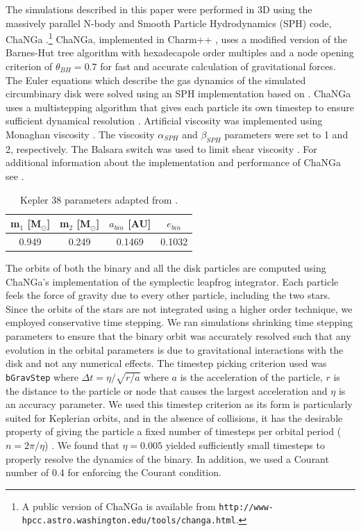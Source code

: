 The simulations described in this paper were performed in 3D using the massively parallel N-body 
and Smooth Particle Hydrodynamics (SPH) code, ChaNGa
\citep{Menon2015}.\footnote{A public version of ChaNGa is available
  from {\tt http://www-hpcc.astro.washington.edu/tools/changa.html}.}
ChaNGa, implemented in Charm++ \citep{Kale1996}, uses a modified version of the Barnes-Hut tree algorithm with hexadecapole 
order multiples and a node opening criterion of $\theta_{BH} =
  0.7$ for fast and accurate calculation of gravitational forces.  The Euler equations which describe
the gas dynamics of the simulated circumbinary disk were solved using an SPH implementation based on
\citet{Wadsley2004}.  ChaNGa uses a multistepping algorithm that gives
each particle its own timestep to ensure sufficient dynamical
resolution \citep{Quinn1997}.  Artificial viscosity was implemented using
Monaghan viscosity \citep{Monaghan1983}.  The viscosity $\alpha_{SPH}$
  and $\beta_{SPH}$ parameters were set to 1 and 2, respectively.  The Balsara switch was used to limit shear viscosity \citep{Balsara1995}.  For additional information about the implementation and performance of ChaNGa see \citet{Jetley2008}.

\begin{table}
	\centering
	\caption{Kepler 38 parameters adapted from \citet{Orosz2012}.}
	\begin{tabular}{cccc} %
		\hline
		m$_1$ [M$_{\odot}$] & m$_2$ [M$_{\odot}$] & $a_{bin}$ [AU] & $e_{bin}$\\
		\hline
		0.949 & 0.249 & 0.1469 & 0.1032\\
		\hline
	\end{tabular}
	\label{tab:CBDisk_table_1}
\end{table}

The orbits of both the binary and all the disk particles are computed using ChaNGa's implementation of the 
symplectic leapfrog integrator.  Each particle feels the force of gravity due to every other particle, including
the two stars.  Since the orbits of the stars are not integrated using a higher order technique, we employed conservative
time stepping.  We ran simulations shrinking time stepping parameters to 
ensure that the binary orbit was accurately resolved such that any evolution in the orbital parameters is due to 
gravitational interactions with the disk and not any numerical
effects.  The timestep picking criterion used was {\tt bGravStep} where  
$\Delta t = \eta/\sqrt{r/a}$ where $a$ is the acceleration of the
particle, $r$ is the distance to the particle or node that causes the largest
acceleration and $\eta$ is an accuracy parameter.  We used this timestep criterion as its form is particularly suited for Keplerian orbits, and in the absence of collisions, it has the desirable property of giving the particle a fixed number of timesteps per orbital period ($n = 2\pi/ \eta$) \citep{Richardson2000}.  We found that 
$\eta = 0.005$ yielded sufficiently small timesteps to properly
resolve the dynamics of the binary.  In addition, we used a Courant number of
0.4 for enforcing the Courant condition.

